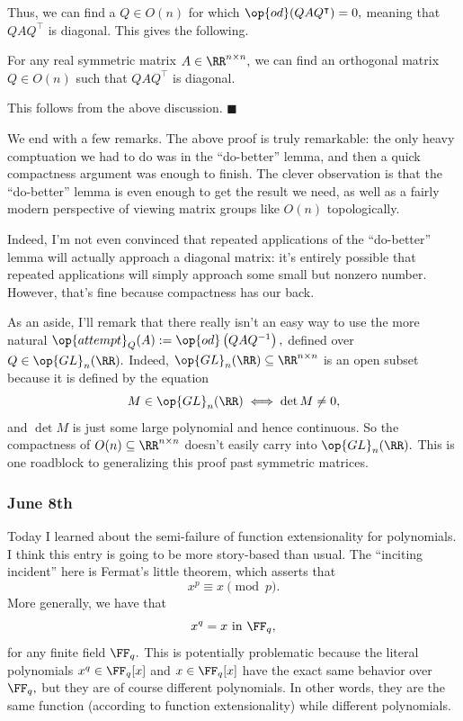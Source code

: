 Thus, we can find a $Q\in O(n)$ for which $\op{od}(QAQ^\intercal)=0,$ meaning that $QAQ^\intercal$ is diagonal. This gives the following.
\begin{theorem}
    For any real symmetric matrix $A\in\RR^{n\times n},$ we can find an orthogonal matrix $Q\in O(n)$ such that $QAQ^\intercal$ is diagonal.
\end{theorem}
This follows from the above discussion. $\blacksquare$

We end with a few remarks. The above proof is truly remarkable: the only heavy comptuation we had to do was in the ``do-better'' lemma, and then a quick compactness argument was enough to finish. The clever observation is that the ``do-better'' lemma is even enough to get the result we need, as well as a fairly modern perspective of viewing matrix groups like $O(n)$ topologically.

Indeed, I'm not even convinced that repeated applications of the ``do-better'' lemma will actually approach a diagonal matrix: it's entirely possible that repeated applications will simply approach some small but nonzero number. However, that's fine because compactness has our back.

As an aside, I'll remark that there really isn't an easy way to use the more natural $\op{attempt}_Q(A):=\op{od}\left(QAQ^{-1}\right),$ defined over $Q\in\op{GL}_n(\RR).$ Indeed, $\op{GL}_n(\RR)\subseteq\RR^{n\times n}$ is an open subset because it is defined by the equation
\[M\in\op{GL}_n(\RR)\iff\det M\ne0,\]
and $\det M$ is just some large polynomial and hence continuous. So the compactness of $O(n)\subseteq\RR^{n\times n}$ doesn't easily carry into $\op{GL}_n(\RR).$ This is one roadblock to generalizing this proof past symmetric matrices.

\subsubsection{June 8th}
Today I learned about the semi-failure of function extensionality for polynomials. I think this entry is going to be more story-based than usual. The ``inciting incident'' here is Fermat's little theorem, which asserts that
\[x^p\equiv x\pmod p.\]
More generally, we have that
\[x^q=x\text{ in }\FF_q,\]
for any finite field $\FF_q.$ This is potentially problematic because the literal polynomials $x^q\in\FF_q[x]$ and $x\in\FF_q[x]$ have the exact same behavior over $\FF_q,$ but they are of course different polynomials. In other words, they are the same function (according to function extensionality) while different polynomials.

